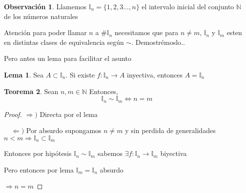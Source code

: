 \documentclass[12pt]{article}
\newcommand{\I}{\mathbb{I}}
\newcommand{\N}{\mathbb{N}}
\newcommand{\Ra}{\Rightarrow}
\newcommand{\ra}{\rightarrow}
\theoremstyle{definition}
\newtheorem*{remark}{Observación}
\newtheorem{theorem}{Teorema}
\newtheorem{lemma}[theorem]{Lema}
\begin{document}
\begin{remark}
Llamemos $\I_{n} = \{1,2,3 \dots ,n\}$ el intervalo inicial del conjunto $\N$ de los números naturales

Atención para poder llamar $n$ a $\# \I_{n}$ necesitamos que para $n \neq m$, $\I_{n}$ y $\I_{m}$ esten en distintas clases de equivalencia según $\sim$. Demostrémoslo..
\end{remark}
Pero antes un lema para facilitar el asunto 
\begin{lemma}
  
  Sea $A \subset \I_{n}$. Si existe $f:\I_{n} \ra A$ inyectiva, entonces $A = \I_{n}$
\end{lemma}

\begin{theorem}
  Sean $n,m \in \N$ Entonces, $$\I_{n} \sim \I_{m} \iff n = m$$

  \begin{proof}
  $\Ra)$ Directa por el lema

$\quad \Leftarrow ) $ Por absurdo supongamos $n \neq m $ y sin perdida de generalidades $n < m \Ra \I_{n} \subset \I_{m}$

Entonces por hipótesis $\I_{n} \sim \I_{m}$ sabemos $\exists f: \I_{n} \ra \I_{m}$ biyectiva 

Pero entonces por lema $\I_{m} = \I_{n}$ absurdo 

$\Ra n = m$ 
  \end{proof}
\end{theorem}
\end{document}
